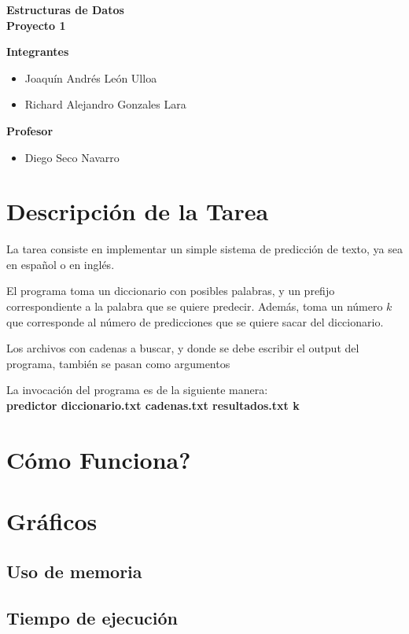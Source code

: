 \documentclass{report}
\begin{document}
    \begin{titlepage}
        \vspace*{5cm}
        \begin{center}
            \Huge{\textbf{Estructuras de Datos \\ Proyecto 1}}
        \end{center}
        \vspace*{2cm}
        \begin{center}
            \textbf{Integrantes}
            \begin{itemize}
                \item Joaquín Andrés León Ulloa
                \item Richard Alejandro Gonzales Lara
            \end{itemize}
            \vspace*{5mm}
            \textbf{Profesor}
            \begin{itemize}
                \item Diego Seco Navarro
            \end{itemize}
        \end{center}
    \end{titlepage}
    \section*{Descripción de la Tarea}
        \justify
        La tarea consiste en implementar un simple
        sistema de predicción de texto, ya sea en
        español o en inglés.
        
        \justify
        El programa toma un diccionario con posibles
        palabras, y un prefijo correspondiente a la
        palabra que se quiere predecir. Además, toma
        un número $k$ que corresponde al número de
        predicciones que se quiere sacar del diccionario.
        
        \justify
        Los archivos con cadenas a buscar, y donde se
        debe escribir el output del programa, también
        se pasan como argumentos
        
        \begin{center}
            La invocación del programa es de la
            siguiente manera:\\
            
            \textbf{predictor diccionario.txt
            cadenas.txt resultados.txt k}
        \end{center}
        
        \section*{Cómo Funciona?}
        
        
        \section*{Gráficos}
            \subsection*{Uso de memoria}
            \subsection*{Tiempo de ejecución}
\end{document}

